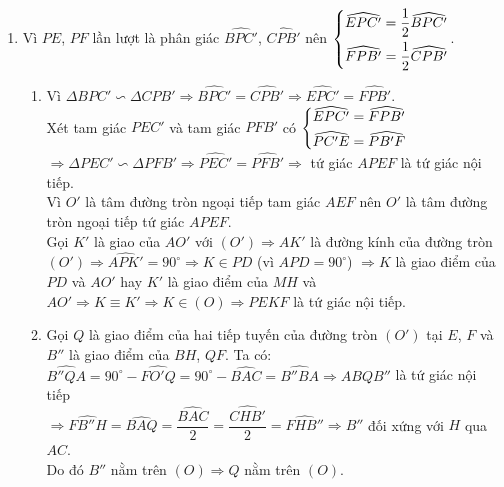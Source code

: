 \begin{ex}
{\begin{enumerate}
\item Vì $PE$, $PF$ lần lượt là phân giác $\widehat{BPC'}$, $\widehat{CPB'}$ nên $\left\{\begin{aligned}&\widehat{EPC'}=\dfrac{1}{2}\widehat{BPC'}\\ & \widehat{FPB'}=\dfrac{1}{2}\widehat{CPB'}\end{aligned}\right.$.
\begin{enumerate}
\item Vì $\Delta BPC'\backsim \Delta CPB'\Rightarrow \widehat{BPC'}=\widehat{CPB'}\Rightarrow \widehat{EPC'}=\widehat{FPB'}$.\\
Xét tam giác $PEC'$ và tam giác $PFB'$ có $\left\{\begin{aligned}&\widehat{EPC'}=\widehat{FPB'}\\ & \widehat{PC'E}=\widehat{PB'F}\end{aligned}\right.$\\
$\Rightarrow\Delta PEC'\backsim\Delta PFB'\Rightarrow\widehat{PEC'}=\widehat{PFB'}\Rightarrow$ tứ giác $APEF$ là tứ giác nội tiếp.\\
Vì $O'$ là tâm đường tròn ngoại tiếp tam giác $AEF$ nên $O'$ là tâm đường tròn ngoại tiếp tứ giác $APEF$.\\
Gọi $K'$ là giao của $AO'$ với $(O')\Rightarrow AK'$ là đường kính của đường tròn $(O')\Rightarrow \widehat{APK'}=90^{\circ}\Rightarrow K\in PD$ (vì $\widehat{APD}=90^{\circ}$) $\Rightarrow K$ là giao điểm của $PD$ và $AO'$ hay $K'$ là giao điểm của $MH$ và $AO'\Rightarrow K\equiv K'\Rightarrow K\in (O)\Rightarrow PEKF$ là tứ giác nội tiếp.
\item Gọi $Q$ là giao điểm của hai tiếp tuyến của đường tròn $(O')$ tại $E$, $F$ và $B''$ là giao điểm của $BH$, $QF$. Ta có:\\
$\widehat{B''QA}=90^{\circ}-\widehat{FO'Q}=90^{\circ}-\widehat{BAC}=\widehat{B''BA}\Rightarrow ABQB''$ là tứ giác nội tiếp\\
$\Rightarrow \widehat{FB''H}=\widehat{BAQ}=\dfrac{\widehat{BAC}}{2}=\dfrac{\widehat{CHB'}}{2}=\widehat{FHB''}\Rightarrow B''$ đối xứng với $H$ qua $AC$.\\
Do đó $B''$ nằm trên $(O)\Rightarrow Q$ nằm trên $(O)$.
\end{enumerate}
\end{enumerate}
}
\end{ex}
